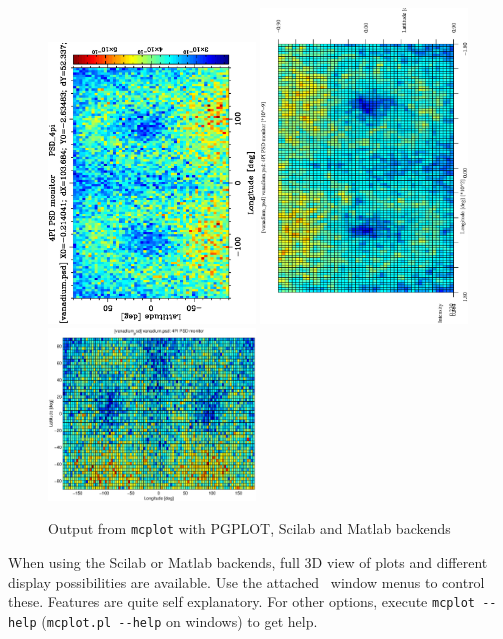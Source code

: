 \begin{figure}[htb!]
  \begin{center}
    \includegraphics[angle=-90,width=0.49\textwidth]{figures/mcplot_PGPLOT.ps}
    \includegraphics[angle=-90,width=0.49\textwidth]{figures/mcplot_Scilab.eps}
    \includegraphics[width=0.49\textwidth]{figures/mcplot_Matlab.eps}
  \end{center}
\caption{Output from \texttt{mcplot} with PGPLOT, Scilab and Matlab backends}
\label{fig:mcplot_figs}
\end{figure}
When using the Scilab or Matlab backends, full 3D view of plots and
different display possibilities are available. Use the attached \MCS\
window menus to control these. Features are quite self
explanatory. For other options, execute \verb+mcplot --help+
(\verb+mcplot.pl --help+ on windows) to get help.

